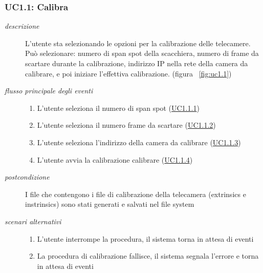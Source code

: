 \subsubsection{UC1.1: Calibra} \label{sec:uc1.1}
\begin{description}
 \item[\em{descrizione}] L'utente sta selezionando le opzioni per la calibrazione delle telecamere. Può selezionare: numero di span spot della scacchiera, numero di frame da scartare durante la calibrazione, indirizzo IP nella rete della camera da calibrare, e poi iniziare l'effettiva calibrazione.  (figura ~\ref{fig:uc1.1})
 
 \item[\em{flusso principale degli eventi}] \mbox{}
 \begin{enumerate}
	\item L'utente seleziona il numero di span spot (\hyperref[sec:uc1.1.1]{UC1.1.1})
	\item L'utente seleziona il numero frame da scartare (\hyperref[sec:uc1.1.2]{UC1.1.2})
	\item L'utente seleziona l'indirizzo della camera da calibrare (\hyperref[sec:uc1.1.3]{UC1.1.3})
	\item L'utente avvia la calibrazione calibrare (\hyperref[sec:uc1.1.4]{UC1.1.4})
\end{enumerate}  
  \item[\em{postcondizione}] I file che contengono i file di
  calibrazione della telecamera (extrinsics e instrinsics) sono stati generati e salvati nel file system
  \item[\em{scenari alternativi}] \mbox{}
  \begin{enumerate}
	\item L'utente interrompe la procedura, il sistema torna in attesa di eventi
	\item La procedura di calibrazione fallisce, il sistema segnala l'errore e torna in attesa di eventi
\end{enumerate} 
 \end{description}
